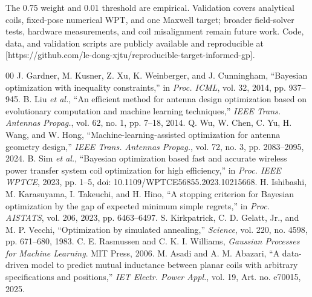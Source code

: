\documentclass[10pt,conference,letterpaper]{IEEEtran}
\begin{document}
The 0.75 weight and 0.01 threshold are empirical. Validation covers analytical coils, fixed-pose numerical WPT, and one Maxwell target; broader field-solver tests, hardware measurements, and coil misalignment remain future work. Code, data, and validation scripts are publicly available and reproducible at [https://github.com/le-dong-xjtu/reproducible-target-informed-gp].

\begin{thebibliography}{00}
 J. Gardner, M. Kusner, Z. Xu, K. Weinberger, and J. Cunningham, ``Bayesian optimization with inequality constraints,'' in \emph{Proc. ICML}, vol. 32, 2014, pp. 937--945.
 B. Liu \emph{et al.}, ``An efficient method for antenna design optimization based on evolutionary computation and machine learning techniques,'' \emph{IEEE Trans. Antennas Propag.}, vol. 62, no. 1, pp. 7--18, 2014.
 Q. Wu, W. Chen, C. Yu, H. Wang, and W. Hong, ``Machine-learning-assisted optimization for antenna geometry design,'' \emph{IEEE Trans. Antennas Propag.}, vol. 72, no. 3, pp. 2083--2095, 2024.
 B. Sim \emph{et al.}, ``Bayesian optimization based fast and accurate wireless power transfer system coil optimization for high efficiency,'' in \emph{Proc. IEEE WPTCE}, 2023, pp. 1--5, doi: 10.1109/WPTCE56855.2023.10215668.
 H. Ishibashi, M. Karasuyama, I. Takeuchi, and H. Hino, ``A stopping criterion for Bayesian optimization by the gap of expected minimum simple regrets,'' in \emph{Proc. AISTATS}, vol. 206, 2023, pp. 6463--6497.
 S. Kirkpatrick, C. D. Gelatt, Jr., and M. P. Vecchi, ``Optimization by simulated annealing,'' \emph{Science}, vol. 220, no. 4598, pp. 671--680, 1983.
 C. E. Rasmussen and C. K. I. Williams, \emph{Gaussian Processes for Machine Learning}. MIT Press, 2006.
 M. Asadi and A. M. Abazari, ``A data-driven model to predict mutual inductance between planar coils with arbitrary specifications and positions,'' \emph{IET Electr. Power Appl.}, vol. 19, Art. no. e70015, 2025.
\end{thebibliography}
\end{document}
